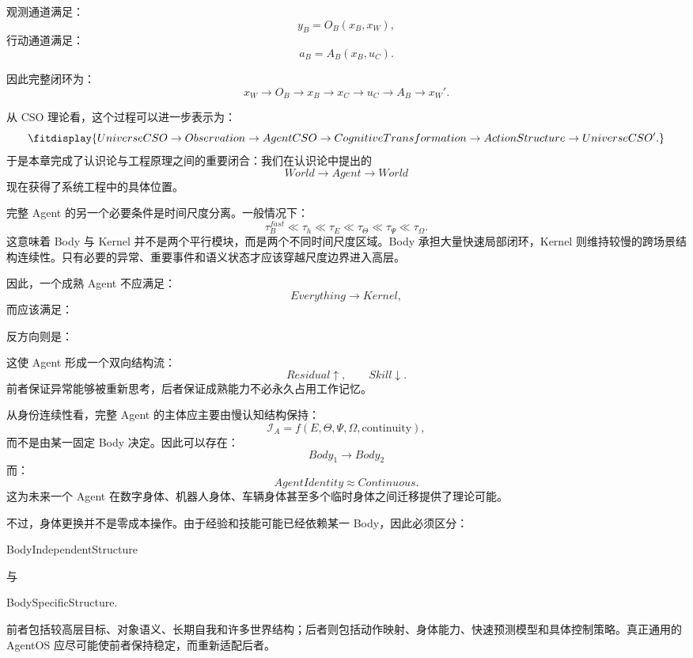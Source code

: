 观测通道满足：
\[
y_B
=
O_B
\left(
x_B,x_W
\right),
\]
行动通道满足：
\[
a_B
=
A_B
\left(
x_B,u_C
\right).
\]

因此完整闭环为：
\[
\boxed{
x_W
\rightarrow
O_B
\rightarrow
x_B
\rightarrow
x_C
\rightarrow
u_C
\rightarrow
A_B
\rightarrow
x_W'.
}
\]

从 CSO 理论看，这个过程可以进一步表示为：
\[
\fitdisplay{
UniverseCSO
\rightarrow
Observation
\rightarrow
AgentCSO
\rightarrow
CognitiveTransformation
\rightarrow
ActionStructure
\rightarrow
UniverseCSO'.
}
\]
于是本章完成了认识论与工程原理之间的重要闭合：我们在认识论中提出的
\[
World
\rightarrow
Agent
\rightarrow
World
\]
现在获得了系统工程中的具体位置。

完整 Agent 的另一个必要条件是时间尺度分离。一般情况下：
\[
\tau_B^{fast}
\ll
\tau_h
\ll
\tau_E
\ll
\tau_\Theta
\ll
\tau_\Psi
\ll
\tau_\Omega.
\]
这意味着 Body 与 Kernel 并不是两个平行模块，而是两个不同时间尺度区域。Body 承担大量快速局部闭环，Kernel 则维持较慢的跨场景结构连续性。只有必要的异常、重要事件和语义状态才应该穿越尺度边界进入高层。

因此，一个成熟 Agent 不应满足：
\[
Everything
\rightarrow
Kernel,
\]
而应该满足：
\begin{statementbox}
\centering
{}
\end{statementbox}
\begin{statementbox}
\centering
{}
\end{statementbox}
反方向则是：
\begin{statementbox}
\centering
{}
\end{statementbox}

这使 Agent 形成一个双向结构流：
\[
Residual\uparrow,
\qquad
Skill\downarrow.
\]
前者保证异常能够被重新思考，后者保证成熟能力不必永久占用工作记忆。

从身份连续性看，完整 Agent 的主体应主要由慢认知结构保持：
\[
\mathcal I_A
=
f(
E,\Theta,\Psi,\Omega,\text{continuity}
),
\]
而不是由某一固定 Body 决定。因此可以存在：
\[
Body_1
\rightarrow
Body_2
\]
而：
\[
AgentIdentity
\approx
Continuous.
\]
这为未来一个 Agent 在数字身体、机器人身体、车辆身体甚至多个临时身体之间迁移提供了理论可能。

不过，身体更换并不是零成本操作。由于经验和技能可能已经依赖某一 Body，因此必须区分：
\begin{statementbox}
BodyIndependentStructure
\end{statementbox}
与
\begin{statementbox}
BodySpecificStructure.
\end{statementbox}
前者包括较高层目标、对象语义、长期自我和许多世界结构；后者则包括动作映射、身体能力、快速预测模型和具体控制策略。真正通用的 AgentOS 应尽可能使前者保持稳定，而重新适配后者。

